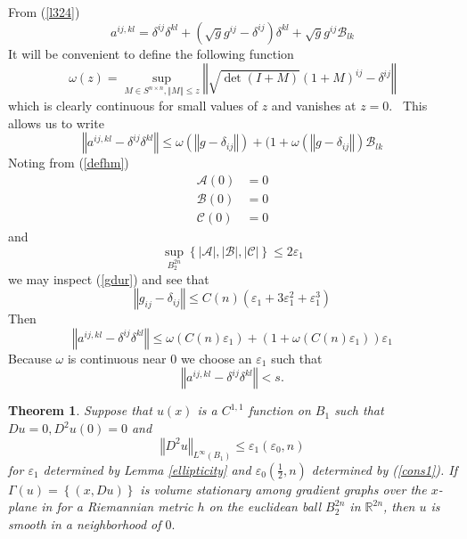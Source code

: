 \documentclass[12pt,leqno]{amsart}%
\newtheorem{theorem}{Theorem}[section]
\theoremstyle{plain}
\numberwithin{equation}{section}
\theoremstyle{definition}
\begin{document}
\proof From (\ref{l324})
\[
a^{ij,kl}=\delta^{ij}\delta^{kl}+\left(  \sqrt{g}g^{ij}-\delta^{ij}\right)
\delta^{kl}+\sqrt{g}g^{ij}{\mathcal{B}}_{lk}%
\]
It will be convenient to define the following function
\[
\omega(z)=\sup_{M\in S^{n\times n},\left\Vert M\right\Vert \leq z}\left\Vert
\sqrt{\det\left(  I+M\right)  }\left(  1+M\right)  ^{ij}-\delta^{ij}%
\right\Vert
\]
which is clearly continuous for small values of $z$ and vanishes at $z=0.$
\ This allows us to write
\[
\left\Vert a^{ij,kl}-\delta^{ij}\delta^{kl}\right\Vert \leq\omega\left(
\left\Vert g-\delta_{ij}\right\Vert \right)  +(1+\omega\left(  \left\Vert
g-\delta_{ij}\right\Vert \right)  {\mathcal{B}}_{lk}%
\]
Noting from (\ref{defhm})
\begin{align*}
{\mathcal{A}}(0)  &  =0\\
{\mathcal{B}}(0)  &  =0\\
{\mathcal{C}}(0)  &  =0
\end{align*}
and
\[
\sup_{B_{2}^{2n}}\left\{  |\mathcal{A}|,|\mathcal{B}|,|\mathcal{C}|\right\}
\leq 2 \varepsilon_{1}%
\]
we may inspect (\ref{gdur}) and see that
\[
\left\Vert g_{ij}-\delta_{ij}\right\Vert \leq C(n)\left(  \varepsilon
_{1}+3\varepsilon_{1}^{2}+\varepsilon_{1}^{3}\right)
\]
Then%
\[
\left\Vert a^{ij,kl}-\delta^{ij}\delta^{kl}\right\Vert \leq\omega\left(
C(n)\varepsilon_{1}\right)  +\left(  1+\omega\left(  C(n)\varepsilon
_{1}\right)  \right)  \varepsilon_{1}%
\]
Because $\omega$ is continuous near $0$ we choose an $\varepsilon_{1}$ such
that
\[
\left\Vert a^{ij,kl}-\delta^{ij}\delta^{kl}\right\Vert <s.
\]
\endproof


\begin{theorem}
\label{3p1} Suppose that $u(x)$ is a $C^{1,1}$ function on $B_{1}$ such that
$Du=0,D^{2}u(0)=0$ and
\[
\left\Vert D^{2}u\right\Vert _{L^{\infty}(B_{1})}\leq\varepsilon
_{1}(\varepsilon_{0},n)
\]
for $\varepsilon_{1}$ determined by Lemma \ref{ellipticity} and $\varepsilon
_{0}(\frac{1}{2},n)$ determined by (\ref{cons1}). If $\Gamma(u)=\left\{
(x,Du)\right\}  $ is volume stationary among gradient graphs over the
$x$-plane in  for a Riemannian metric $h$ on the euclidean ball $B_{2}^{2n}$
in $\mathbb{R}^{2n}$, then $u$ is smooth in a neighborhood of $0.$
\end{theorem}
\end{document}
